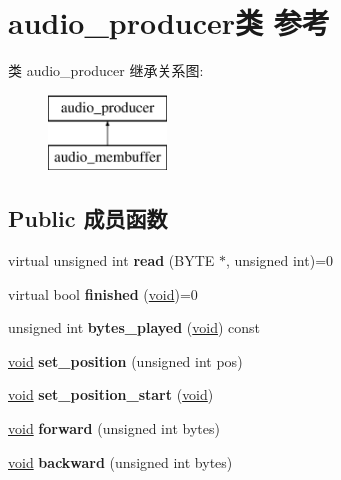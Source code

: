 \hypertarget{classaudio__producer}{}\section{audio\+\_\+producer类 参考}
\label{classaudio__producer}
类 audio\+\_\+producer 继承关系图\+:\begin{figure}[H]
\begin{center}
\leavevmode
\includegraphics[height=2.000000cm]{classaudio__producer}
\end{center}
\end{figure}
\subsection*{Public 成员函数}
\begin{DoxyCompactItemize}
\item 
\mbox{\label{classaudio__producer_a371ccdeb7a8a3b9903eac0f2d5431059}} 
virtual unsigned int {\bfseries read} (B\+Y\+TE $\ast$, unsigned int)=0
\item 
\mbox{\label{classaudio__producer_aa88157bc5b0c0c808ebf5212fa968b65}} 
virtual bool {\bfseries finished} (\hyperlink{interfacevoid}{void})=0
\item 
\mbox{\label{classaudio__producer_a9b85f0fb1794cbcf6f09f128b658e87f}} 
unsigned int {\bfseries bytes\+\_\+played} (\hyperlink{interfacevoid}{void}) const
\item 
\mbox{\label{classaudio__producer_aba2b9688914e1b6a465d7bfdc59c2d35}} 
\hyperlink{interfacevoid}{void} {\bfseries set\+\_\+position} (unsigned int pos)
\item 
\mbox{\label{classaudio__producer_a4d3cdff503901abe571c22fca3a19e3c}} 
\hyperlink{interfacevoid}{void} {\bfseries set\+\_\+position\+\_\+start} (\hyperlink{interfacevoid}{void})
\item 
\mbox{\label{classaudio__producer_a6f8dbbd9a7dc4f339e5700c006d215e7}} 
\hyperlink{interfacevoid}{void} {\bfseries forward} (unsigned int bytes)
\item 
\mbox{\label{classaudio__producer_a05243e3972cac8d21705e5f6acbd80bb}} 
\hyperlink{interfacevoid}{void} {\bfseries backward} (unsigned int bytes)
\end{DoxyCompactItemize}
